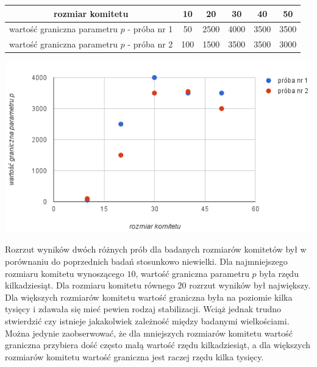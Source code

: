 \documentclass[pdflatex,11pt]{../aghdoc_version2}
\begin{document}
\begin{center}
\begin{tabular}{|c|c|c|c|c|c|}
   \hline
   rozmiar komitetu & 10 & 20 & 30 & 40 & 50 \\
   \hline
   wartość graniczna parametru $p$ - próba nr 1 & 50 & 2500 & 4000 & 3500 & 3500 \\
   \hline
   wartość graniczna parametru $p$ - próba nr 2 & 100 & 1500 & 3500 & 3500 & 3000 \\
   \hline
\end{tabular}
\end{center}

\vspace{\baselineskip}

\begin{center}
\centerline{\includegraphics[scale=1]{pics/wartosc_graniczna_od_rozmiar_komitetu.png}}
\end{center}

Rozrzut wyników dwóch różnych prób dla badanych rozmiarów komitetów był w porównaniu do poprzednich badań stosunkowo niewielki. Dla najmniejszego rozmiaru komitetu wynoszącego $10$, wartość graniczna parametru $p$ była rzędu kilkadziesiąt. Dla rozmiaru komitetu równego $20$ rozrzut wyników był największy. Dla większych rozmiarów komitetu wartość graniczna była na poziomie kilka tysięcy i zdawała się mieć pewien rodzaj stabilizacji. Wciąż jednak trudno stwierdzić czy istnieje jakakolwiek zależność między badanymi wielkościami. Można jedynie zaobserwować, że dla mniejszych rozmiarów komitetu wartość graniczna przybiera dość często małą wartość rzędu kilkadziesiąt, a dla większych rozmiarów komitetu wartość graniczna jest raczej rzędu kilka tysięcy.
\end{document}
